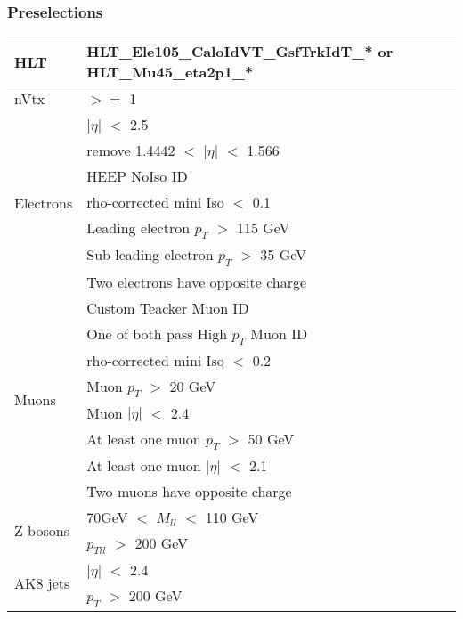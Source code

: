 \documentclass[7pt,aspectratio=1610]{beamer}
\begin{document}
\begin{frame}
  \frametitle{Preselections}
  \justifying
  \begin{tiny}
    \begin{center}
      \begin{tabular}[t]{ | l | l | }
        \hline
        HLT       
        & HLT\_Ele105\_CaloIdVT\_GsfTrkIdT\_* or HLT\_Mu45\_eta2p1\_*  \\
        \hline
        nVtx 
        & $>=$ 1                                         \\
        \hline
        \multirow{7}{*}{Electrons} 
        & $|\eta|$ $<$ 2.5                               \\
        & remove 1.4442 $<$ $|\eta|$ $<$ 1.566           \\
        & HEEP NoIso ID                                  \\
        & rho-corrected mini Iso $<$ 0.1                 \\
        & Leading electron $p_T$ $>$ 115 GeV             \\
        & Sub-leading electron $p_T$ $>$ 35 GeV          \\
        & Two electrons have opposite charge             \\
        \hline
        \multirow{8}{*}{Muons}
        & Custom Teacker Muon ID                         \\ 
        & One of both pass High $p_T$ Muon ID            \\
        & rho-corrected mini Iso $<$ 0.2                 \\
        & Muon $p_T$ $>$ 20 GeV                          \\
        & Muon $|\eta|$ $<$ 2.4                          \\
        & At least one muon $p_T$ $>$ 50 GeV             \\
        & At least one muon $|\eta|$ $<$ 2.1             \\
        & Two muons have opposite charge                 \\
        \hline
        \multirow{2}{*}{Z bosons}
        & 70GeV $<$ $M_{ll}$ $<$ 110 GeV                 \\
        & $p_{Tll}$ $>$ 200 GeV                          \\
        \hline
        \multirow{6}{*}{AK8 jets}
        & $|\eta|$ $<$ 2.4                               \\ 
        & $p_T$ $>$ 200 GeV                              \\

\end{tabular}
\end{center}
\end{tiny}
\end{frame}
\end{document}
